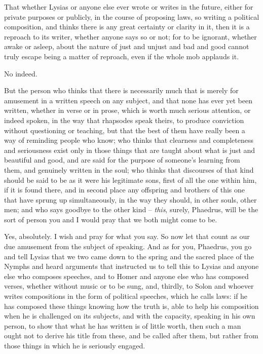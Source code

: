 That whether Lysias or anyone else ever wrote or writes in the
future, either for private purposes or publicly, in the course of
proposing laws, so writing a political composition, and thinks there is
any great certainty or clarity in it, then it is  a reproach to
its writer, whether anyone says so or not; for to  be ignorant,
whether awake or asleep, about the nature of just and unjust and bad and
good cannot truly escape being a matter of reproach, even if the whole
mob applauds it.

No indeed.

 But the person who thinks that there is necessarily
much that is merely for amusement in a written speech on any subject,
and that none has ever yet been written, whether in verse or in prose,
which is worth much serious attention, or indeed spoken, in the way that
rhapsodes speak theirs,
to produce conviction without questioning or teaching, but that
 the best of them have really been a way of reminding people
who know; who thinks that clearness and completeness and seriousness
exist only in those things that are taught about what is just and
beautiful and good, and are said for the purpose of  someone's
learning from them, and genuinely written in the soul; who thinks that
discourses of that kind
should be said to be as it were his legitimate sons, first of all the
one within  him, if it is found there, and in second place any
offspring and brothers of this one that have sprung up simultaneously,
in the way they should, in other souls, other men; and who says goodbye
to the other kind -- {\em this}, surely, Phaedrus, will be the sort of
person you and I would pray that we both might come to be.

 Yes, absolutely. I wish and pray for what you say.
So now let that count as our due amusement from the subject of
speaking. And as for you, Phaedrus, you go and tell Lysias that we two
came down to the spring and the sacred  place of the Nymphs and
heard arguments that
instructed us to tell this to Lysias and anyone else who composes
speeches, and to Homer and anyone else who has composed verses, whether
without music or to be sung, and, thirdly, to Solon and whoever writes
compositions in the form of political speeches,  which he calls
laws: if he has composed these things knowing how the truth is, able to
help his composition when he is challenged on its subjects, and with the
capacity, speaking in his own person, to show that what he has written
is of little worth, then
such a man ought not to derive his title from these, and be called after
them, but rather from those things in  which he is seriously
engaged.

